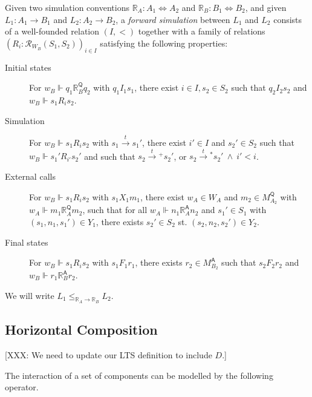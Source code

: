 \documentclass[sigplan,10pt,review,anonymous]{acmart}
\newcommand{\kw}[1]{\ensuremath{ \mathsf{#1} }}
\begin{document}
\begin{definition}
Given
two simulation conventions
$\mathbb{R}_A : A_1 \Leftrightarrow A_2$ and
$\mathbb{R}_B : B_1 \Leftrightarrow B_2$,
and given
$L_1 : A_1 \rightarrow B_1$ and
$L_2 : A_2 \rightarrow B_2$,
a \emph{forward simulation} between $L_1$ and $L_2$
consists of a
well-founded relation $(I, <)$
together with a family of relations
$(R_i : \mathcal{R}_{W_B}(S_1, S_2))_{i \in I}$
satisfying the following properties:
\begin{description}
\item[Initial states]
  For
  $w_B \Vdash q_1 \mathrel{\mathbb{R}_B^\kw{Q}} q_2$
  with $q_1 \mathrel{I_1} s_1$,
  there exist $i \in I, s_2 \in S_2$
  such that $q_2 \mathrel{I_2} s_2$ and
  $w_B \Vdash s_1 \mathrel{R_i} s_2$.
\item[Simulation]
  For $w_B \Vdash s_1 \mathrel{R_i} s_2$
  with $s_1 \stackrel{t}{\rightarrow} s_1'$,
  there exist $i' \in I$ and $s_2' \in S_2$
  such that $w_B \Vdash s_1' \mathrel{R_{i'}} s_2'$ and
  such that
    $s_2 \mathrel{\stackrel{t}{\rightarrow}{\!\!}^+} s_2'$, or
    $s_2 \mathrel{\stackrel{t}{\rightarrow}{\!\!}^*} s_2' \:\wedge\: i' < i$.
\item[External calls]
  For $w_B \Vdash s_1 \mathrel{R_i} s_2$
  with $s_1 \mathrel{X_1} m_1$,
  there exist $w_A \in W_A$ and $m_2 \in M_{A_2}^\kw{Q}$
  with $w_A \Vdash m_1 \mathrel{\mathbb{R}_A^\kw{Q}} m_2$,
  such that for all
  $w_A \Vdash n_1 \mathrel{\mathbb{R}_A^\kw{A}} n_2$
  and $s_1' \in S_1$ with $(s_1, n_1, s_1') \in Y_1$,
  there exists $s_2' \in S_2$ st.
  $(s_2, n_2, s_2') \in Y_2$.
\item[Final states]
  For $w_B \Vdash s_1 \mathrel{R_i} s_2$
  with $s_1 \mathrel{F_1} r_1$,
  there exists $r_2 \in M_{B_2}^\kw{A}$ such that
  $s_2 \mathrel{F_2} r_2$ and $w_B \Vdash r_1 \mathrel{\mathbb{R}_B^\kw{A}} r_2$.
\end{description}
We will write $L_1 \le_{\mathbb{R}_A \rightarrow \mathbb{R}_B} L_2$.
\end{definition}


\subsection{Horizontal Composition} \label{sec:sem:linker} %

[XXX: We need to update our LTS definition to include $D$.]

The interaction of a set of components
can be modelled by the following operator.
\end{document}

